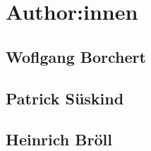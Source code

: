 \chapter{Author:innen}

\section[personen:wolfgang_borchert]{Woflgang Borchert}

\section[personen:patrick_sueskind]{Patrick Süskind}

\section[personen:heinrich_boell]{Heinrich Bröll}
